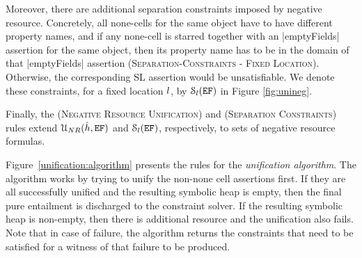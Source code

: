 Moreover, there are additional separation constraints imposed by negative resource. Concretely, all none-cells for the same object have to have different property names, and if any none-cell is starred together with an \jsinline|emptyFields| assertion for the same object, then its property name has to be in the domain of that \jsinline|emptyFields| assertion (\textsc{Separation-Constraints - Fixed Location}). Otherwise, the corresponding SL assertion would be unsatisfiable. We denote these constraints, for a fixed location $l$, by ${\cal S}_{l}(\mathtt{EF})$ in Figure \ref{fig:unineg}. 

Finally, the (\textsc{Negative Resource Unification}) and (\textsc{Separation Constraints}) rules extend ${\cal U}_{NR}(\hat{h}, \mathtt{EF})$ and ${\cal S}_{l}(\mathtt{EF})$, respectively, to sets of negative resource formulas.


Figure~\ref{unification:algorithm} presents the rules for the \emph{unification algorithm}. 
The algorithm works by trying to unify the non-none cell assertions first. If they are all 
successfully unified and the resulting symbolic heap is empty, then the final pure entailment 
is discharged to the constraint solver. If the resulting symbolic heap is non-empty, then there 
is additional resource and the unification also fails. Note that in case of failure, the algorithm 
returns the constraints that need to be satisfied for a witness of that failure to be produced. 

